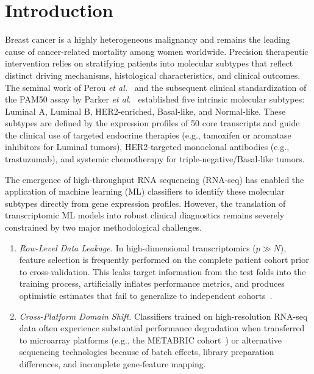 \documentclass[10pt,a4paper,twocolumn]{article}
\begin{document}
\section{Introduction}

Breast cancer is a highly heterogeneous malignancy and remains the leading cause of cancer-related mortality among women worldwide. Precision therapeutic intervention relies on stratifying patients into molecular subtypes that reflect distinct driving mechanisms, histological characteristics, and clinical outcomes. The seminal work of Perou \textit{et al.}~\cite{perou2000} and the subsequent clinical standardization of the PAM50 assay by Parker \textit{et al.}~\cite{parker2009} established five intrinsic molecular subtypes: Luminal A, Luminal B, HER2-enriched, Basal-like, and Normal-like. These subtypes are defined by the expression profiles of 50 core transcripts and guide the clinical use of targeted endocrine therapies (e.g., tamoxifen or aromatase inhibitors for Luminal tumors), HER2-targeted monoclonal antibodies (e.g., trastuzumab), and systemic chemotherapy for triple-negative/Basal-like tumors.

The emergence of high-throughput RNA sequencing (RNA-seq) has enabled the application of machine learning (ML) classifiers to identify these molecular subtypes directly from gene expression profiles. However, the translation of transcriptomic ML models into robust clinical diagnostics remains severely constrained by two major methodological challenges.

\begin{enumerate}
    \item \textit{Row-Level Data Leakage.} In high-dimensional transcriptomics ($p \gg N$), feature selection is frequently performed on the complete patient cohort prior to cross-validation. This leaks target information from the test folds into the training process, artificially inflates performance metrics, and produces optimistic estimates that fail to generalize to independent cohorts~\cite{kapoor2022}.

    \item \textit{Cross-Platform Domain Shift.} Classifiers trained on high-resolution RNA-seq data often experience substantial performance degradation when transferred to microarray platforms (e.g., the METABRIC cohort~\cite{curtis2012}) or alternative sequencing technologies because of batch effects, library preparation differences, and incomplete gene-feature mapping.
\end{enumerate}
\end{document}
